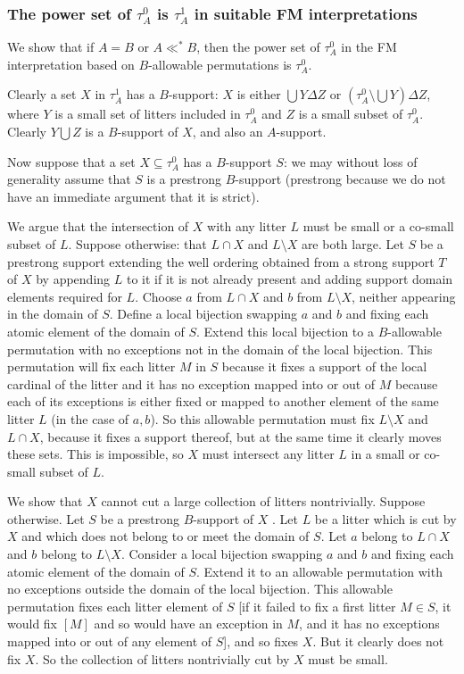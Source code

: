 \documentclass[12pt]{article}
\begin{document}
\newpage

\subsubsection{The power set of $\tau^0_A$ is $\tau^1_A$ in suitable FM interpretations}

We show that if $A=B$ or $A \ll^* B$, then the power set of $\tau^0_A$ in the FM interpretation based on $B$-allowable permutations is $\tau^0_A$.

Clearly a set $X$ in $\tau^1_A$ has a $B$-support:  $X$ is either $\bigcup Y \Delta Z$ or $(\tau^0_A \setminus \bigcup Y) \Delta Z$, where $Y$ is a small set
of litters included in $\tau^0_A$ and $Z$ is a small subset of $\tau^0_A$.  Clearly $Y \bigcup Z$ is a $B$-support of $X$, and also an $A$-support.

Now suppose that a set $X \subseteq \tau^0_A$ has a $B$-support $S$:  we may without loss of generality assume that $S$ is a prestrong $B$-support (prestrong because
we do not have an immediate argument that it is strict).

We argue that the intersection of $X$ with any litter $L$ must be small or a co-small subset of $L$.  Suppose otherwise:  that $L \cap X$ and $L \setminus X$ are both large.
Let $S$ be a prestrong support extending the well ordering obtained from a strong support $T$ of $X$ by appending $L$ to it if it is not already present and adding support domain elements required for $L$. 
 Choose $a$ from $L \cap X$ and $b$ from $L \setminus X$, neither appearing in the domain of $S$.  Define a local bijection swapping $a$ and $b$ and fixing each atomic element of the domain of $S$.  Extend this local bijection to
a $B$-allowable permutation with no exceptions not in the domain of the local bijection.  This permutation will fix each litter $M$ in $S$ because it fixes a support of the local cardinal of the litter
and it has no exception mapped into or out of $M$ because each of its exceptions is either fixed or mapped to another element of the same litter $L$ (in the case of $a,b$).
So this allowable permutation must fix $L \setminus X$ and $L \cap X$, because it fixes a support thereof, but at the same time it clearly moves these sets.  This is impossible,
so $X$ must intersect any litter $L$ in a small or co-small subset of $L$.

We show that $X$ cannot cut a large collection of litters nontrivially.  Suppose otherwise.  Let $S$ be a prestrong $B$-support of $X$ .  Let $L$ be a litter which is cut by $X$
and which does not belong to or meet the domain of $S$.  Let $a$ belong to $L \cap X$ and $b$ belong to $L \setminus X$.  Consider a local bijection swapping $a$ and $b$ and fixing each atomic element of the domain of $S$.  Extend it to an allowable permutation with no exceptions outside the domain of the local bijection.  This allowable permutation fixes each litter
element of $S$ [if it failed to fix a first litter $M\in S$, it would fix $[M]$ and so would have an exception in $M$, and it has no exceptions mapped into or out of any element of $S$], and so fixes $X$.  But it clearly does not fix $X$.  So the collection of litters nontrivially cut by $X$ must be small.
\end{document}
